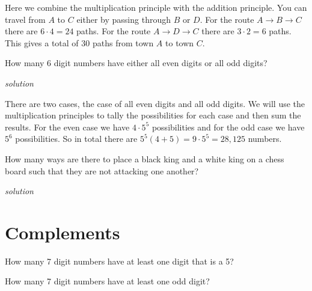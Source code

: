 \documentclass{amsbook}
\begin{document}
\begin{Answer}[ref={ap1}]
    Here we combine the multiplication principle with the addition principle. You can travel from $A$ to $C$ either by passing through $B$ or $D$. For the route $A\to B \to C$ there are $6\cdot 4=24$ paths. For the route $A \to D \to C$ there are $3\cdot 2 =6$ paths. This gives a total of 30 paths from town $A$ to town $C$.
\end{Answer}

\begin{Exercise}[title={Digits of the same Parity}, difficulty =1, label=ap2]
    How many 6 digit numbers have either all even digits or all odd digits?

    \hfill \emph{solution} 
\end{Exercise}

\begin{Answer}[ref={ap2}]
    There are two cases, the case of all even digits and all odd digits. We will use the multiplication principles to tally the possibilities for each case and then sum the results. For the even case we have $4\cdot 5^5$ possibilities and for the odd case we have $5^6$ possibilities. So in total there are $5^5(4+5)=9\cdot 5^5=28,125$ numbers.
\end{Answer}

\begin{Exercise}[title={An Excuse to Play Chess II}, difficulty=2, label=ap3]
    How many ways are there to place a black king and a white king on a chess board such that they are not attacking one another?

    \hfill \emph{solution} 
\end{Exercise}

\begin{Answer}[ref={ap3}]
    
\end{Answer}

\section{Complements}

\begin{Exercise}[title={Phone Numbers?}, difficulty=2, label=co1]
    How many 7 digit numbers have at least one digit that is a 5?
    
\end{Exercise}

\begin{Exercise}[title={Phone Numbers II?}, difficulty =2, label=co2]
    How many 7 digit numbers have at least one odd digit?
\end{Exercise}
\end{document}
